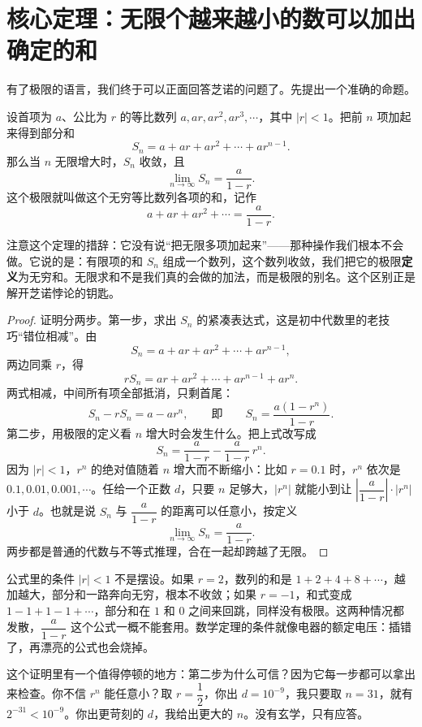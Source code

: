 \section{核心定理：无限个越来越小的数可以加出确定的和}

有了极限的语言，我们终于可以正面回答芝诺的问题了。先提出一个准确的命题。

\begin{dingli}[无穷等比数列的和]\label{ch9:geo}
设首项为 $a$、公比为 $r$ 的等比数列 $a,ar,ar^2,ar^3,\cdots$，其中 $|r|<1$。把前 $n$ 项加起来得到部分和
\[
S_n=a+ar+ar^2+\cdots+ar^{n-1}.
\]
那么当 $n$ 无限增大时，$S_n$ 收敛，且
\[
\lim_{n\to\infty}S_n=\frac{a}{1-r}.
\]
这个极限就叫做这个无穷等比数列各项的和，记作
\[
a+ar+ar^2+\cdots=\frac{a}{1-r}.
\]
\end{dingli}

注意这个定理的措辞：它没有说“把无限多项加起来”——那种操作我们根本不会做。它说的是：有限项的和 $S_n$ 组成一个数列，这个数列收敛，我们把它的极限\textbf{定义}为无穷和。无限求和不是我们真的会做的加法，而是极限的别名。这个区别正是解开芝诺悖论的钥匙。

\begin{proof}
证明分两步。第一步，求出 $S_n$ 的紧凑表达式，这是初中代数里的老技巧“错位相减”。由
\[
S_n=a+ar+ar^2+\cdots+ar^{n-1},
\]
两边同乘 $r$，得
\[
rS_n=ar+ar^2+\cdots+ar^{n-1}+ar^{n}.
\]
两式相减，中间所有项全部抵消，只剩首尾：
\[
S_n-rS_n=a-ar^n,
\qquad\text{即}\qquad
S_n=\frac{a(1-r^n)}{1-r}.
\]
第二步，用极限的定义看 $n$ 增大时会发生什么。把上式改写成
\[
S_n=\frac{a}{1-r}-\frac{a}{1-r}\,r^n.
\]
因为 $|r|<1$，$r^n$ 的绝对值随着 $n$ 增大而不断缩小：比如 $r=0.1$ 时，$r^n$ 依次是 $0.1,0.01,0.001,\cdots$。任给一个正数 $d$，只要 $n$ 足够大，$|r^n|$ 就能小到让 $\left|\dfrac{a}{1-r}\right|\cdot|r^n|$ 小于 $d$。也就是说 $S_n$ 与 $\dfrac{a}{1-r}$ 的距离可以任意小，按定义
\[
\lim_{n\to\infty}S_n=\frac{a}{1-r}.
\]
两步都是普通的代数与不等式推理，合在一起却跨越了无限。
\end{proof}

公式里的条件 $|r|<1$ 不是摆设。如果 $r=2$，数列的和是 $1+2+4+8+\cdots$，越加越大，部分和一路奔向无穷，根本不收敛；如果 $r=-1$，和式变成 $1-1+1-1+\cdots$，部分和在 $1$ 和 $0$ 之间来回跳，同样没有极限。这两种情况都发散，$\dfrac{a}{1-r}$ 这个公式一概不能套用。数学定理的条件就像电器的额定电压：插错了，再漂亮的公式也会烧掉。

这个证明里有一个值得停顿的地方：第二步为什么可信？因为它每一步都可以拿出来检查。你不信 $r^n$ 能任意小？取 $r=\dfrac{1}{2}$，你出 $d=10^{-9}$，我只要取 $n=31$，就有 $2^{-31}<10^{-9}$。你出更苛刻的 $d$，我给出更大的 $n$。没有玄学，只有应答。

